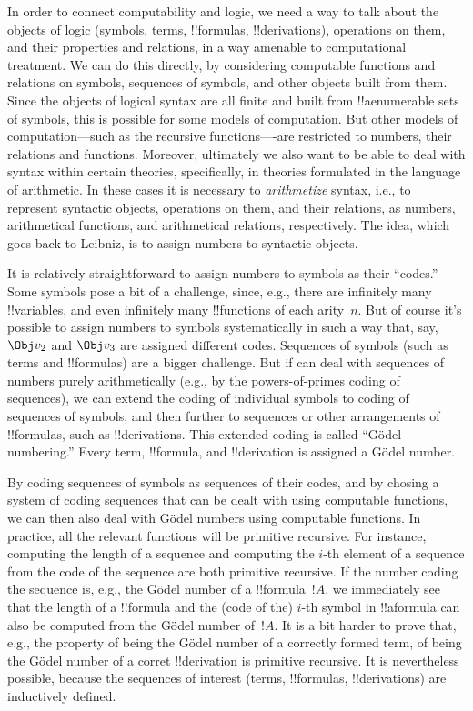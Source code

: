 \documentclass[../../../include/open-logic-section]{subfiles}
\begin{document}

In order to connect computability and logic, we need a way to talk
about the objects of logic (symbols, terms, !!{formula}s,
!!{derivation}s), operations on them, and their properties and
relations, in a way amenable to computational treatment.  We can do
this directly, by considering computable functions and relations on
symbols, sequences of symbols, and other objects built from them.
Since the objects of logical syntax are all finite and built from
!!a{enumerable} sets of symbols, this is possible for some models of
computation.  But other models of computation---such as the recursive
functions----are restricted to numbers, their relations and functions.
Moreover, ultimately we also want to be able to deal with syntax
within certain theories, specifically, in theories formulated in the
language of arithmetic.  In these cases it is necessary to
\emph{arithmetize} syntax, i.e., to represent syntactic objects,
operations on them, and their relations, as numbers, arithmetical
functions, and arithmetical relations, respectively. The idea, which
goes back to Leibniz, is to assign numbers to syntactic objects.

It is relatively straightforward to assign numbers to symbols as their
``codes.''  Some symbols pose a bit of a challenge, since, e.g., there
are infinitely many !!{variable}s, and even infinitely many
!!{function}s of each arity~$n$. But of course it's possible to assign
numbers to symbols systematically in such a way that, say, $\Obj v_2$
and $\Obj v_3$ are assigned different codes. Sequences of symbols
(such as terms and !!{formula}s) are a bigger challenge. But if can
deal with sequences of numbers purely arithmetically (e.g., by the
powers-of-primes coding of sequences), we can extend the coding of
individual symbols to coding of sequences of symbols, and then further
to sequences or other arrangements of !!{formula}s, such as
!!{derivation}s. This extended coding is called ``G\"odel numbering.''
Every term, !!{formula}, and !!{derivation} is assigned a G\"odel
number.

By coding sequences of symbols as sequences of their codes, and by
chosing a system of coding sequences that can be dealt with using
computable functions, we can then also deal with G\"odel numbers using
computable functions.  In practice, all the relevant functions will be
primitive recursive.  For instance, computing the length of a sequence
and computing the $i$-th element of a sequence from the code of the
sequence are both primitive recursive. If the number coding the
sequence is, e.g., the G\"odel number of a !!{formula}~$!A$, we
immediately see that the length of a !!{formula} and the (code of the)
$i$-th symbol in !!a{formula} can also be computed from the G\"odel
number of~$!A$. It is a bit harder to prove that, e.g., the property
of being the G\"odel number of a correctly formed term, of being the
G\"odel number of a corret !!{derivation} is primitive recursive.  It
is nevertheless possible, because the sequences of interest (terms,
!!{formula}s, !!{derivation}s) are inductively defined.
\end{document}
